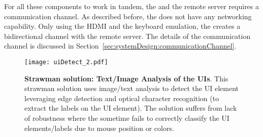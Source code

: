 For all these components to work in tandem, the \device and the remote server requires a communication channel. As described before, the \device does not have any networking capability. Only using the HDMI and the keyboard emulation, the \device creates a bidirectional channel with the remote server. The details of the communication channel is discussed in Section~\ref{sec:systemDesign:communicationChannel}.
\fi

\iffalse
\subsection{Initialization} 
\label{sec:systemDesign:init}

There are two steps of initialization process: 

\begin{mylist}
  \item\textbf{IO initialization.} The \device initializes the mouse by instructing the host system to move the mouse pointer to the top right corner (moving to the first right and then up for an arbitrarily large value). As the \device has access to the frames that are displayed on the screen, it can verify if the mouse pointer is at the top-right corner of the screen or not. Then it instructs the host OS to bring it to the center of the screen.
  
  \item\textbf{Network initialization.} The \device connects to the remote server using \webusb or \webbt, effectively using the host as an untrusted transport. The \device and the server establishes a secure channel with the public certificates that are distributed before-hand.
\end{mylist}
\fi


\begin{figure}[t]
\centering
\texttt{[image: uiDetect\_2.pdf]}
\caption{\textbf{Strawman solution: Text/Image Analysis of the UIs}. This strawman solution uses image/text analysis to detect the UI element leveraging edge detection and optical character recognition (to extract the labels on the UI element). The solution suffers from lack of robustness where the \device sometime fails to correctly classify the UI elements/labels due to mouse position or colors.}
\label{fig:uiDetect}
\centering
\end{figure}



